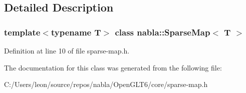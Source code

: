 \subsection{Detailed Description}
\subsubsection*{template$<$typename T$>$\newline
class nabla\+::\+Sparse\+Map$<$ T $>$}



Definition at line 10 of file sparse-\/map.\+h.



The documentation for this class was generated from the following file\+:\begin{DoxyCompactItemize}
\item 
C\+:/\+Users/leon/source/repos/nabla/\+Open\+G\+L\+T6/core/sparse-\/map.\+h\end{DoxyCompactItemize}
